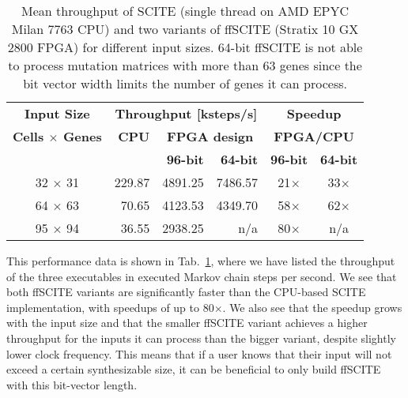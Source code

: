 \begin{table}[tbh]
    \begin{tabular}{crrrcc}
        \toprule
        \textbf{Input Size}
        & \multicolumn{3}{c}{\textbf{Throughput [ksteps/s]}} 
        & \multicolumn{2}{c}{\textbf{Speedup}} \\
        \cmidrule(r){1-1}
        \cmidrule(r){2-4}
        \cmidrule(r){5-6}
        \textbf{Cells $\times$ Genes}
        & \textbf{CPU} 
        & \multicolumn{2}{c}{\textbf{FPGA design}}
        & \multicolumn{2}{c}{\textbf{FPGA/CPU}} \\
        \cmidrule(r){3-4}
        \cmidrule(r){5-6}
        & & \textbf{96-bit} & \textbf{64-bit} & \textbf{96-bit} & \textbf{64-bit} \\
        32 $\times$ 31 & 229.87 & 4891.25 & 7486.57  & 21$\times$ & 33$\times$ \\
        64 $\times$ 63 &  70.65 & 4123.53 & 4349.70  & 58$\times$ & 62$\times$ \\
        95 $\times$ 94 &  36.55 & 2938.25 & n/a      & 80$\times$ & n/a \\
        \bottomrule
    \end{tabular}
    \caption{Mean throughput of SCITE (single thread on AMD EPYC Milan 7763 CPU) and two variants of \ac{ffSCITE} (Stratix 10 GX 2800 FPGA) for different input sizes. 64-bit \ac{ffSCITE} is not able to process mutation matrices with more than 63 genes since the bit vector width limits the number of genes it can process. 
    }
    \label{tab:throughput}
\end{table}

This performance data is shown in Tab.~\ref{tab:throughput}, where we have listed the throughput of the three executables in executed Markov chain steps per second. We see that both \ac{ffSCITE} variants are significantly faster than the CPU-based \ac{SCITE} implementation, with speedups of up to 80$\times$. We also see that the speedup grows %
with the input size and that the smaller \ac{ffSCITE} variant achieves a higher throughput for the inputs it can process than the bigger variant, despite slightly lower clock frequency. This means that if a user knows that their input will not exceed a certain synthesizable size, it can be beneficial to only build \ac{ffSCITE} with this bit-vector length.

